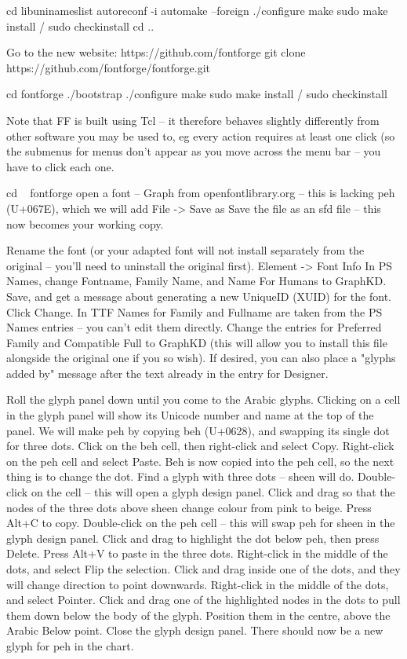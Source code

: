 cd libuninameslist
autoreconf -i
automake --foreign
./configure
make
sudo make install / sudo checkinstall
cd ..

Go to the new website:
https://github.com/fontforge
git clone https://github.com/fontforge/fontforge.git

cd fontforge
./bootstrap
./configure
make
sudo make install / sudo checkinstall

Note that FF is built using Tcl -- it therefore behaves slightly differently from other software you may be used to, eg every action requires at least one click (so the submenus for menus don't appear as you move across the menu bar -- you have to click each one.

cd ~
fontforge
open a font -- Graph from openfontlibrary.org  -- this is lacking peh (U+067E), which we will add
File -> Save as
Save the file as an sfd file -- this now becomes your working copy.

Rename the font (or your adapted font will not install separately from the original -- you'll need to uninstall the original first).
Element -> Font Info
In PS Names, change Fontname, Family Name, and Name For Humans to GraphKD.
Save, and get a message about generating a new UniqueID (XUID) for the font.
Click Change.
In TTF Names for Family and Fullname are taken from the PS Names entries -- you can't edit them directly.
Change the entries for Preferred Family and Compatible Full to GraphKD (this will allow you to install this file alongside the original one if you so wish).
If desired, you can also place a "glyphs added by" message after the text already in the entry for Designer.

Roll the glyph panel down until you come to the Arabic glyphs.
Clicking on a cell in the glyph panel will show its Unicode number and name at the top of the panel.
We will make peh by copying beh (U+0628), and swapping its single dot for three dots.
Click on the beh cell, then right-click and select Copy.
Right-click on the peh cell and select Paste.
Beh is now copied into the peh cell, so the next thing is to change the dot.
Find a glyph with three dots -- sheen will do.
Double-click on the cell -- this will open a glyph design panel.
Click and drag so that the nodes of the three dots above sheen change colour from pink to beige.
Press Alt+C to copy.
Double-click on the peh cell -- this will swap peh for sheen in the glyph design panel.
Click and drag to highlight the dot below peh, then press Delete.
Press Alt+V to paste in the three dots.
Right-click in the middle of the dots, and select Flip the selection.
Click and drag inside one of the dots, and they will change direction to point downwards.
Right-click in the middle of the dots, and select Pointer.
Click and drag one of the highlighted nodes in the dots to pull them down below the body of the glyph.
Position them in the centre, above the Arabic Below point.
Close the glyph design panel.
There should now be a new glyph for peh in the chart.

